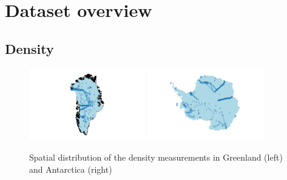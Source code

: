 \documentclass[journal abbreviation, manuscript]{copernicus}
\begin{document}


\section{Dataset overview}
\subsection{Density}

\small
{}
\small
{}

\begin{figure}[!htb]
\caption{Spatial distribution of the density measurements in Greenland (left) and Antarctica (right)}
\centering
\includegraphics[width=0.45\textwidth]{figures/density_map_greenland.png}
\includegraphics[width=0.45\textwidth]{figures/density_map_antarctica.png}
\end{figure}
\end{document}
